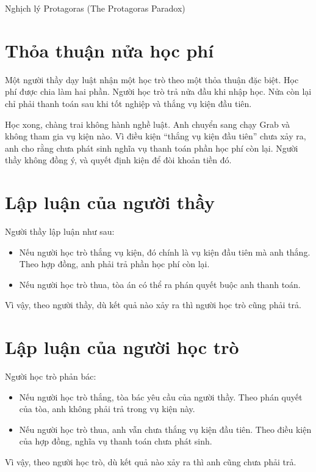 \begin{vd}{Nghịch lý Protagoras (The Protagoras Paradox)}

\section*{Thỏa thuận nửa học phí}

Một người thầy dạy luật nhận một học trò theo một thỏa thuận đặc biệt. Học phí được chia làm hai phần. Người học trò trả nửa đầu khi nhập học. Nửa còn lại chỉ phải thanh toán sau khi tốt nghiệp và thắng vụ kiện đầu tiên.

Học xong, chàng trai không hành nghề luật. Anh chuyển sang chạy Grab và không tham gia vụ kiện nào. Vì điều kiện “thắng vụ kiện đầu tiên” chưa xảy ra, anh cho rằng chưa phát sinh nghĩa vụ thanh toán phần học phí còn lại. Người thầy không đồng ý, và quyết định kiện để đòi khoản tiền đó.

\section*{Lập luận của người thầy}

Người thầy lập luận như sau:

\begin{itemize}
    \item Nếu người học trò thắng vụ kiện, đó chính là vụ kiện đầu tiên mà anh thắng. Theo hợp đồng, anh phải trả phần học phí còn lại.
    \item Nếu người học trò thua, tòa án có thể ra phán quyết buộc anh thanh toán.
\end{itemize}

Vì vậy, theo người thầy, dù kết quả nào xảy ra thì người học trò cũng phải trả.

\section*{Lập luận của người học trò}

Người học trò phản bác:

\begin{itemize}
    \item Nếu người học trò thắng, tòa bác yêu cầu của người thầy. Theo phán quyết của tòa, anh không phải trả trong vụ kiện này.
    \item Nếu người học trò thua, anh vẫn chưa thắng vụ kiện đầu tiên. Theo điều kiện của hợp đồng, nghĩa vụ thanh toán chưa phát sinh.
\end{itemize}

Vì vậy, theo người học trò, dù kết quả nào xảy ra thì anh cũng chưa phải trả.

\end{vd}

